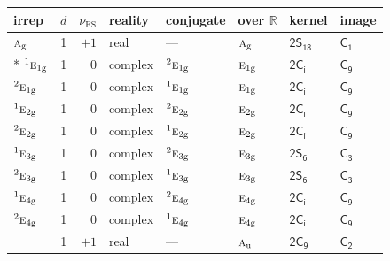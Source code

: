 \documentclass[10pt,a4paper]{article}
\numberwithin{equation}{section}
\newcommand{\grp}[1]{\mathsf{#1}}
\newcommand{\irr}[1]{\text{\normalfont\scshape #1}}
\newcommand{\conjpair}[1]{{}^{#1}}
\newcommand{\detbox}[1]{{\setlength{\fboxsep}{1pt}\fbox{#1}}}
\newcommand{\ptag}[1]{\mathrm{#1}}
\newcommand{\fsind}{\nu_{\mathrm{FS}}}
\begin{document}
{\small\renewcommand{\arraystretch}{1.25}\setlength{\tabcolsep}{4pt}\begin{longtable}{@{}lrrlllll@{}}\toprule
irrep & $d$ & $\fsind$ & reality & conjugate & over $\mathbb{R}$ & kernel & image\\\midrule\endhead
\bottomrule\endfoot\endlastfoot
$\irr{a}_{\ptag{g}}$ & 1 & $+1$ & real & --- & $\irr{a}_{\ptag{g}}$ & \href{2S18.pdf}{$\grp{2S_{18}}$} & \href{../../../rotation/data/pdf/C1.pdf}{$\grp{C_{1}}$}\\*
$\conjpair{1}\irr{e}_{1\ptag{g}}$ & 1 & $0$ & complex & $\conjpair{2}\irr{e}_{1\ptag{g}}$ & $\irr{e}_{1\ptag{g}}$ & \href{2S2.pdf}{$\grp{2C_{i}}$} & \href{../../../rotation/data/pdf/C9.pdf}{$\grp{C_{9}}$}\\
$\conjpair{2}\irr{e}_{1\ptag{g}}$ & 1 & $0$ & complex & $\conjpair{1}\irr{e}_{1\ptag{g}}$ & $\irr{e}_{1\ptag{g}}$ & \href{2S2.pdf}{$\grp{2C_{i}}$} & \href{../../../rotation/data/pdf/C9.pdf}{$\grp{C_{9}}$}\\
$\conjpair{1}\irr{e}_{2\ptag{g}}$ & 1 & $0$ & complex & $\conjpair{2}\irr{e}_{2\ptag{g}}$ & $\irr{e}_{2\ptag{g}}$ & \href{2S2.pdf}{$\grp{2C_{i}}$} & \href{../../../rotation/data/pdf/C9.pdf}{$\grp{C_{9}}$}\\
$\conjpair{2}\irr{e}_{2\ptag{g}}$ & 1 & $0$ & complex & $\conjpair{1}\irr{e}_{2\ptag{g}}$ & $\irr{e}_{2\ptag{g}}$ & \href{2S2.pdf}{$\grp{2C_{i}}$} & \href{../../../rotation/data/pdf/C9.pdf}{$\grp{C_{9}}$}\\
$\conjpair{1}\irr{e}_{3\ptag{g}}$ & 1 & $0$ & complex & $\conjpair{2}\irr{e}_{3\ptag{g}}$ & $\irr{e}_{3\ptag{g}}$ & \href{2S6.pdf}{$\grp{2S_{6}}$} & \href{../../../rotation/data/pdf/C3.pdf}{$\grp{C_{3}}$}\\
$\conjpair{2}\irr{e}_{3\ptag{g}}$ & 1 & $0$ & complex & $\conjpair{1}\irr{e}_{3\ptag{g}}$ & $\irr{e}_{3\ptag{g}}$ & \href{2S6.pdf}{$\grp{2S_{6}}$} & \href{../../../rotation/data/pdf/C3.pdf}{$\grp{C_{3}}$}\\
$\conjpair{1}\irr{e}_{4\ptag{g}}$ & 1 & $0$ & complex & $\conjpair{2}\irr{e}_{4\ptag{g}}$ & $\irr{e}_{4\ptag{g}}$ & \href{2S2.pdf}{$\grp{2C_{i}}$} & \href{../../../rotation/data/pdf/C9.pdf}{$\grp{C_{9}}$}\\
$\conjpair{2}\irr{e}_{4\ptag{g}}$ & 1 & $0$ & complex & $\conjpair{1}\irr{e}_{4\ptag{g}}$ & $\irr{e}_{4\ptag{g}}$ & \href{2S2.pdf}{$\grp{2C_{i}}$} & \href{../../../rotation/data/pdf/C9.pdf}{$\grp{C_{9}}$}\\
\detbox{$\irr{a}_{\ptag{u}}$} & 1 & $+1$ & real & --- & $\irr{a}_{\ptag{u}}$ & \href{2C9.pdf}{$\grp{2C_{9}}$} & \href{../../../rotation/data/pdf/C2.pdf}{$\grp{C_{2}}$}\\

\end{longtable}}
\end{document}
